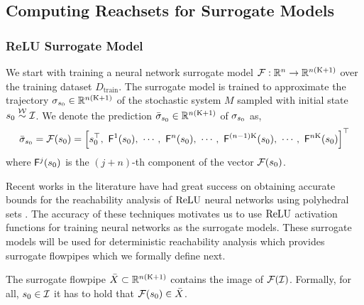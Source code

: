 \subsection{Computing Reachsets for Surrogate Models}
\subsubsection{ReLU Surrogate Model}
We start with training a  neural network surrogate model $\mathcal{F}: \mathbb{R}^n \to \mathbb{R}^{n(\mathrm{K}+1)}$ over the training dataset $D_{\text{train}}$. The surrogate model is trained to approximate the trajectory $\sigma_{s_{0}} \in \mathbb{R}^{n(\mathrm{K}+1)}$ of the stochastic system $M$ sampled with initial state $s_0 \stackrel{\mathcal{W}}{\sim} \mathcal{I}$. We denote the prediction $\bar{\sigma}_{s_{0}} \in \mathbb{R}^{n(\mathrm{K}+1)}$ of $\sigma_{s_{0}}$ as,  
$$
\bar{\traj}_{\state_{0}} = \overallf(\state_{0}) = 
\left[ \state_0^\top ,\ \mathsf{F}^1(\state_0) , \  \cdots ,\ \mathsf{F}^n(\state_0), \  \cdots , \  \mathsf{F}^{(n-1)\horizon}(\state_0) ,\  \cdots ,\  \mathsf{F}^{n\horizon}(\state_0)\right]^\top
$$
where $\mathsf{F}^j(s_0)$ is the $(j+n)$-th component of the vector $\mathcal{F}(s_0)$. 

Recent works in the literature have had great success on obtaining accurate bounds for the reachability analysis of $\mathrm{ReLU}$ neural networks  using polyhedral sets  \cite{tran2019star,tran2019safety,tran2020nnv}. The accuracy of these techniques motivates us to use $\mathrm{ReLU}$ activation functions for training neural networks as the surrogate models. These surrogate models will be used for deterministic reachability analysis which provides surrogate flowpipes which we formally define next. 

\begin{definition} 
The surrogate flowpipe $\bar{X}\subset \mathbb{R}^{n(\mathrm{K}+1)}$ contains the image of $\mathcal{F}(\mathcal{I})$. Formally, for all, $s_0\in \mathcal{I}$ it has to hold that
$\mathcal{F}(s_0) \in \bar{X}$.   
\end{definition}

